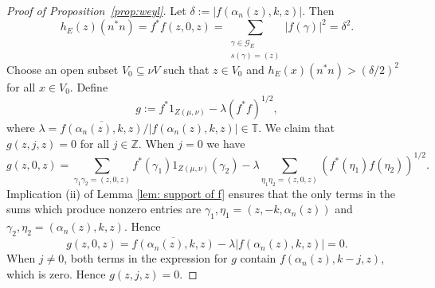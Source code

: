 \documentclass[12pt, a4paper]{amsart}
\numberwithin{equation}{section}
\theoremstyle{definition}
\theoremstyle{remark}
\begin{document}
\begin{proof}[Proof of Proposition~\ref{prop:weyl}]
Let $\delta:=|f(\alpha_n(z),k,z)|$. Then 
\[
h_E(z)(n^*n)=f^*f(z,0,z)=\sum_{\substack{\gamma\in{\mathcal{G}}_E \\ s(\gamma)=(z)}}
|f(\gamma)|^2=\delta^2.
\]
Choose an open subset $V_0\subseteq \nu V$ such that $z\in V_0$ and 
$h_E(x)(n^*n)>(\delta/2)^2$ for all $x\in V_0$. Define
\[
g:=f 
^*1_{Z(\mu,\nu)}-\lambda(f^*f)^{1/2},
\]
where $\lambda=\overline{f(\alpha_n(z),k,z)}/|f(\alpha_n(z),k,z)|\in{\mathbb{T}}$. We 
claim that $g(z,j,z)=0$ for all $j\in{\mathbb{Z}}$. When $j=0$ we 
have 
\[
g(z,0,z)=\sum_{\gamma_1\gamma_2=(z,0,z)}f^*(\gamma_1)1_{Z(\mu,\nu)}(\gamma_2) 
- 
\lambda\sum_{\eta_1\eta_2=(z,0,z)}(f^*(\eta_1)f(\eta_2))^{1/2}
.\]
Implication (ii) of Lemma \ref{lem: support of f} ensures that the only terms in the sums which produce nonzero 
entries are $\gamma_1,\eta_1=(z,-k,\alpha_n(z))$ and 
$\gamma_2,\eta_2=(\alpha_n(z),k,z)$. Hence
\[
g(z,0,z)=\overline{f(\alpha_n(z),k,z)}-\lambda|f(\alpha_n(z),k,z)|=0.
\]
When $j\not=0$, both terms in the expression for $g$ contain 
$f(\alpha_n(z),k-j,z)$, which is zero. Hence $g(z,j,z)=0$. 


\end{proof}
\end{document}
